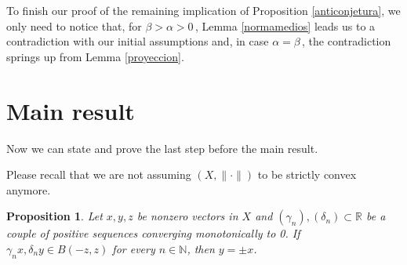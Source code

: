 \documentclass[12pt]{amsproc}
\newtheorem{prop}[theorem]{Proposition}
\theoremstyle{remark}
\def\R{\mathbb R}
\def\N{\mathbb N}
\def\norma{\|\cdot\|}
\begin{document}
To finish our proof of the remaining implication of Proposition \ref{anticonjetura}, we only need to notice that, for $\beta>\alpha>0\,$, Lemma \ref{normamedios} leads us to a contradiction with our initial assumptions and, in case $\alpha=\beta\,$, the contradiction springs up from Lemma \ref{proyeccion}.

\medskip

\section{Main result}\label{mainresult}

Now we can state and prove the last step before the main result. 

Please recall that we are not assuming $(X,\norma)$ to be strictly convex anymore. 

\begin{prop}\label{DosRectas}
Let $x, y, z$ be nonzero vectors in $X$ and $(\gamma_n), (\delta_n)\subset\R$ be a 
couple of positive sequences converging monotonically to 0. If $\gamma_nx, 
\delta_ny\in B(-z,z)$ for every $n\in\N$, then $y=\pm x$. 
\end{prop}
\end{document}
